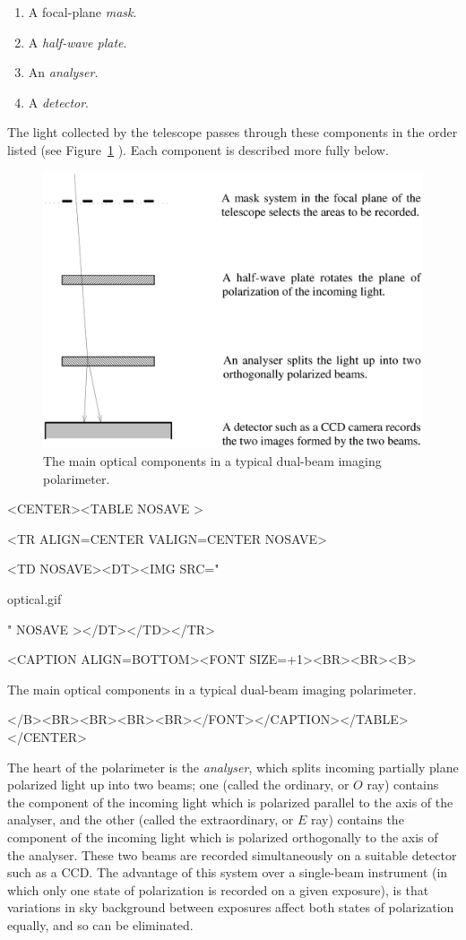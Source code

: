 \documentclass[twoside,11pt]{article}
\newenvironment{latexonly}{}{}
\newcommand{\latex}[1]{#1}
\newcommand{\html}[1]{}
\renewcommand{\_}{\texttt{\symbol{95}}}
\newcommand{\htmlfig}[3]{
   \label{#1}
   \begin{rawhtml} <CENTER><TABLE NOSAVE > \end{rawhtml}
   \begin{rawhtml} <TR ALIGN=CENTER VALIGN=CENTER NOSAVE> \end{rawhtml}
   \begin{rawhtml} <TD NOSAVE><DT><IMG SRC=" \end{rawhtml}
   #2
   \begin{rawhtml} " NOSAVE ></DT></TD></TR> \end{rawhtml}
   \begin{rawhtml} <CAPTION ALIGN=BOTTOM><FONT SIZE=+1><BR><BR><B> \end{rawhtml}
   #3 
   \begin{rawhtml} </B><BR><BR><BR><BR></FONT></CAPTION></TABLE></CENTER> \end{rawhtml}
}
\begin{document}
\begin{enumerate}
\item A focal-plane \emph{mask}.
\item A \emph{half-wave plate}.
\item An \emph{analyser}.
\item A \emph{detector}.
\end{enumerate}

The light collected by the telescope passes through these components in
the order listed (see \latex{Figure~\ref{fig:optical}} \html{the next figure}
). Each component is described more fully below.

\begin{latexonly}
  \vspace{2mm}
  \begin{figure}[htb]
  \begin{center}
  \includegraphics[clip,scale=0.5]{sun223_figures/optical.eps}
  \caption{The main optical components in a typical dual-beam imaging polarimeter.}
  \label{fig:optical}
  \end{center}
  \end{figure}
\end{latexonly}

\begin{htmlonly}
\htmlfig{fig:optical}{optical.gif}{The main optical components in a
typical dual-beam imaging polarimeter.}
\end{htmlonly}

The heart of the polarimeter is the \emph{analyser}, which splits incoming
partially plane polarized light up into two beams; one (called the
ordinary, or $O$ ray) contains the component of the incoming light
which is polarized parallel to the axis of the analyser, and the other
(called the extraordinary, or $E$ ray) contains the component of the
incoming light which is polarized orthogonally to the axis of the
analyser. These two beams are recorded simultaneously on a suitable
detector such as a CCD. The advantage of this system over a single-beam
instrument (in which only one state of polarization is recorded on a
given exposure), is that variations in sky background between exposures
affect both states of polarization equally, and so can be eliminated.
\end{document}
